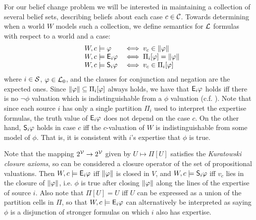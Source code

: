 For our belief change problem we will be interested in maintaining a
collection of several belief sets, describing beliefs about each case $c \in
\C$. Towards determining when a world $W$ models such a collection, we define
semantics for $\lext$ formulas with respect to a world and a case:
\[
    \begin{array}{lll}
        &W, c \models \phi &\iff v_c \in \propmods{\phi} \\
        &W, c \models \E_i\phi &\iff \Pi_i[\phi] = \propmods{\phi} \\
        &W, c \models \S_i\phi &\iff v_c \in \Pi_i[\phi]
    \end{array}
\]
where $i \in \srcs$, $\phi \in \lprop$, and the clauses for conjunction and
negation are the expected ones. Since $\propmods{\phi} \subseteq \Pi_i[\phi]$
always holds, we have that $\E_i\phi$ holds iff there is no
$\neg\phi$ valuation which is indistinguishable from a $\phi$ valuation (c.f.
\textcite{booth_trust_2018}). Note
that since each source $i$ has only a single partition $\Pi_i$ used to
interpret the expertise formulas, the truth value of $\E_i\phi$ does not
depend on the case $c$. On the other hand, $\S_i\phi$ holds in case $c$ iff
the $c$-valuation of $W$ is indistinguishable from some model of $\phi$. That
is, it is consistent with $i$'s expertise that $\phi$ is true.

Note that the mapping $2^\vals \rightarrow 2^\vals$ given by $U \mapsto \Pi[U]$
satisfies the \emph{Kuratowski closure axioms},\footnotemark{} so can be
considered a closure operator of the set of propositional valuations. Then $W,
c \models \E_i\phi$ iff $\propmods{\phi}$ is closed in $V$, and $W, c \models
\S_i\phi$ iff $v_c$ lies in the closure of $\propmods{\phi}$, i.e. $\phi$ is
true after closing $\propmods{\phi}$ along the lines of the expertise of source
$i$. Also note that $\Pi[U] = U$ iff $U$ can be expressed as a union of the
partition cells in $\Pi$, so that $W, c \models \E_i\phi$ can alternatively be
interpreted as saying $\phi$ is a disjunction of stronger formulas on which $i$
also has expertise.
%

